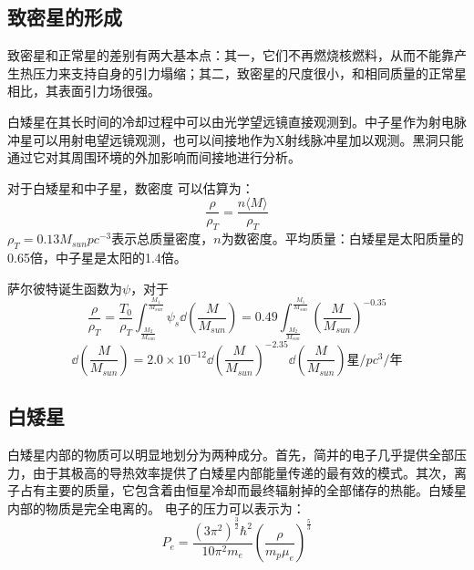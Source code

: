 \subsection{致密星的形成}
致密星和正常星的差别有两大基本点：其一，它们不再燃烧核燃料，从而不能靠产生热压力来支持自身的引力塌缩；其二，致密星的尺度很小，和相同质量的正常星相比，其表面引力场很强。

白矮星在其长时间的冷却过程中可以由光学望远镜直接观测到。中子星作为射电脉冲星可以用射电望远镜观测，也可以间接地作为X射线脉冲星加以观测。黑洞只能通过它对其周围环境的外加影响而间接地进行分析。

对于白矮星和中子星，数密度 可以估算为：
\begin{equation}
	\frac{\rho}{\rho_{T}}=\frac{n\langle M\rangle}{\rho_{T}}
\end{equation}
$\rho_{T}=0.13M_{sun}pc^{-3}$表示总质量密度，$n$为数密度。平均质量：白矮星是太阳质量的0.65倍，中子星是太阳的1.4倍。

萨尔彼特诞生函数为$\psi$，对于
\begin{equation}
	\frac{\rho}{\rho_{T}}=\frac{T_{0}}{\rho_{T}}\int_{\frac{M_{2}}{M_{sun}}}^{\frac{M_{1}}{M_{sun}}}\psi_{s}\dd \left(\frac{M}{M_{sun}}\right)=0.49\int_{\frac{M_{2}}{M_{sun}}}^{\frac{M_{1}}{M_{sun}}}\left(\frac{M}{M_{sun}}\right)^{-0.35}
\end{equation}
\begin{equation*}
	\dd \left(\frac{M}{M_{sun}}\right)=2.0\times 10^{-12}\dd \left(\frac{M}{M_{sun}}\right)^{-2.35}\dd \left(\frac{M}{M_{sun}}\right) \mbox{星}/pc^3/\mbox{年}
\end{equation*}
\subsection{白矮星}
白矮星内部的物质可以明显地划分为两种成分。首先，简并的电子几乎提供全部压力，由于其极高的导热效率提供了白矮星内部能量传递的最有效的模式。其次，离子占有主要的质量，它包含着由恒星冷却而最终辐射掉的全部储存的热能。白矮星内部的物质是完全电离的。
电子的压力可以表示为：
\begin{equation}
	P_{e}=\frac{\left(3\pi^2\right)^{\frac{3}{2}}\hbar^2}{10\pi^2m_{e}}\left(\frac{\rho}{m_{p}\mu_{e}}\right)^{\frac{5}{3}}
\end{equation}

